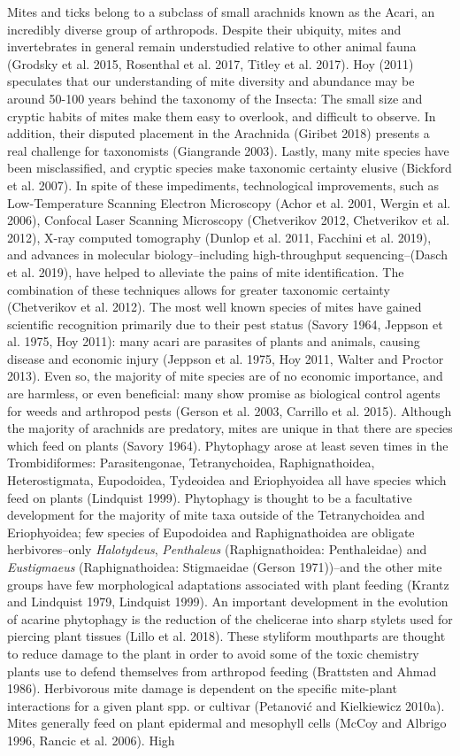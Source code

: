 \documentclass[12pt,final,CPage]{ufthesis}
\begin{document}
{  Mites and ticks belong to a subclass of small arachnids known as the Acari, an incredibly diverse group of arthropods. Despite their ubiquity, mites and invertebrates in general remain understudied relative to other animal fauna (Grodsky et al. 2015, Rosenthal et al. 2017, Titley et al. 2017). Hoy (2011) speculates that our understanding of mite diversity and abundance may be around 50-100 years behind the taxonomy of the Insecta: The small size and cryptic habits of mites make them easy to overlook, and difficult to observe. In addition, their disputed placement in the Arachnida (Giribet 2018) presents a real challenge for taxonomists (Giangrande 2003). Lastly, many mite species have been misclassified, and cryptic species make taxonomic certainty elusive (Bickford et al. 2007). In spite of these impediments, technological improvements, such as Low-Temperature Scanning Electron Microscopy (Achor et al. 2001, Wergin et al. 2006), Confocal Laser Scanning Microscopy (Chetverikov 2012, Chetverikov et al. 2012), X-ray computed tomography (Dunlop et al. 2011, Facchini et al. 2019), and advances in molecular biology--including high-throughput sequencing--(Dasch et al. 2019), have helped to alleviate the pains of mite identification. The combination of these techniques allows for greater taxonomic certainty (Chetverikov et al. 2012). The most well known species of mites have gained scientific recognition primarily due to their pest status (Savory 1964, Jeppson et al. 1975, Hoy 2011): many acari are parasites of plants and animals, causing disease and economic injury (Jeppson et al. 1975, Hoy 2011, Walter and Proctor 2013). Even so, the majority of mite species are of no economic importance, and are harmless, or even beneficial: many show promise as biological control agents for weeds and arthropod pests (Gerson et al. 2003, Carrillo et al. 2015). Although the majority of arachnids are predatory, mites are unique in that there are species which feed on plants (Savory 1964). Phytophagy arose at least seven times in the Trombidiformes: Parasitengonae, Tetranychoidea, Raphignathoidea, Heterostigmata, Eupodoidea, Tydeoidea and Eriophyoidea all have species which feed on plants (Lindquist 1999). Phytophagy is thought to be a facultative development for the majority of mite taxa outside of the Tetranychoidea and Eriophyoidea; few species of Eupodoidea and Raphignathoidea are obligate herbivores--only \emph{Halotydeus}, \emph{Penthaleus} (Raphignathoidea: Penthaleidae) and \emph{Eustigmaeus} (Raphignathoidea: Stigmaeidae (Gerson 1971))--and the other mite groups have few morphological adaptations associated with plant feeding (Krantz and Lindquist 1979, Lindquist 1999). An important development in the evolution of acarine phytophagy is the reduction of the chelicerae into sharp stylets used for piercing plant tissues (Lillo et al. 2018). These styliform mouthparts are thought to reduce damage to the plant in order to avoid some of the toxic chemistry plants use to defend themselves from arthropod feeding (Brattsten and Ahmad 1986). Herbivorous mite damage is dependent on the specific mite-plant interactions for a given plant spp. or cultivar (Petanović and Kielkiewicz 2010a). Mites generally feed on plant epidermal and mesophyll cells (McCoy and Albrigo 1996, Rancic et al. 2006). High }
\end{document}
